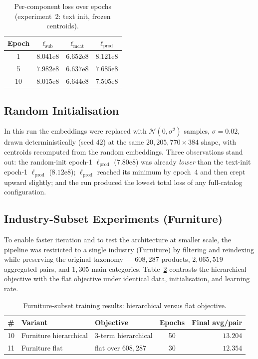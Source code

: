 \begin{table}[ht]
  \centering
  \caption{Per-component loss over epochs (experiment~2: text init, frozen
           centroids).}
  \label{tab:emb-split}
  \begin{tabular}{cccc}
    \toprule
    Epoch & $\ell_{\text{sub}}$ & $\ell_{\text{mcat}}$ & $\ell_{\text{prod}}$ \\
    \midrule
    1  & $8.041\mathrm{e}{8}$ & $6.652\mathrm{e}{8}$ & $8.121\mathrm{e}{8}$ \\
    5  & $7.982\mathrm{e}{8}$ & $6.637\mathrm{e}{8}$ & $7.685\mathrm{e}{8}$ \\
    10 & $8.015\mathrm{e}{8}$ & $6.644\mathrm{e}{8}$ & $7.505\mathrm{e}{8}$ \\
    \bottomrule
  \end{tabular}
\end{table}

\subsection{Random Initialisation}
In this run the embeddings were replaced with $\mathcal{N}(0,\sigma^2)$ samples,
$\sigma=0.02$, drawn deterministically (seed $42$) at the same
$20{,}205{,}770\times 384$ shape, with centroids recomputed from the random
embeddings. Three observations stand out: the random-init epoch-1
$\ell_{\text{prod}}$ ($7.80\mathrm{e}{8}$) was already \emph{lower} than the
text-init epoch-1 $\ell_{\text{prod}}$ ($8.12\mathrm{e}{8}$);
$\ell_{\text{prod}}$ reached its minimum by epoch~4 and then crept upward
slightly; and the run produced the lowest total loss of any full-catalog
configuration.

\subsection{Industry-Subset Experiments (Furniture)}
To enable faster iteration and to test the architecture at smaller scale, the
pipeline was restricted to a single industry (Furniture) by filtering and
reindexing while preserving the original taxonomy --- $608{,}287$ products,
$2{,}065{,}519$ aggregated pairs, and $1{,}305$ main-categories.
Table~\ref{tab:emb-furniture} contrasts the hierarchical objective with the
flat objective under identical data, initialisation, and learning rate.

\begin{table}[ht]
  \centering
  \caption{Furniture-subset training results: hierarchical versus flat
           objective.}
  \label{tab:emb-furniture}
  \begin{tabular}{cllcr}
    \toprule
    \# & Variant & Objective & Epochs & Final avg/pair \\
    \midrule
    10 & Furniture hierarchical & 3-term hierarchical     & 50 & $13.204$ \\
    11 & Furniture flat         & flat over $608{,}287$    & 30 & $12.354$ \\
    \bottomrule
  \end{tabular}
\end{table}


